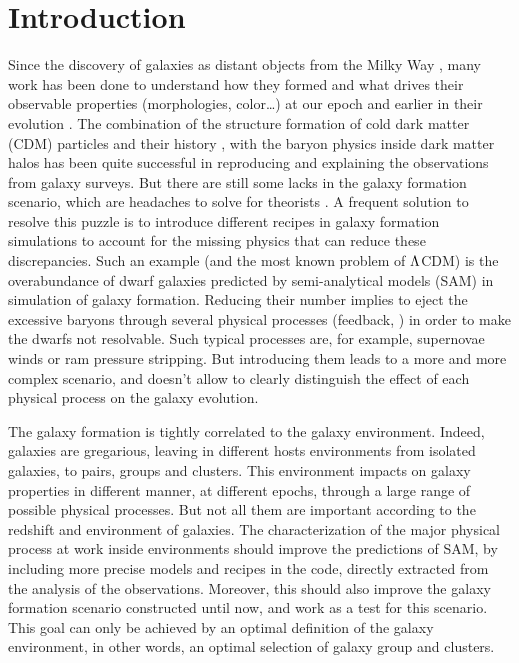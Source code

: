 \chapter{Introduction}
%
Since the discovery of galaxies as distant objects from the Milky Way
\citep{Hubble+29}, many work has been done to understand how they formed and
what drives their observable properties (morphologies, color\ldots) at our
epoch and earlier in their evolution \citep{Benson+10,Silk+12,Silk+13}. The
combination of the structure formation of cold dark matter (CDM) particles
and their history \citep{Zentner+07}, with the baryon physics inside dark
matter halos \citep{Kravtsov+12} has been quite successful in reproducing
and explaining the observations from galaxy surveys. But there are still
some lacks in the galaxy formation scenario, which are headaches to solve
for theorists \citep{Weinmann+12}. A frequent solution to resolve this
puzzle is to introduce different recipes in galaxy formation simulations to
account for the missing physics that can reduce these discrepancies.
%
Such an example (and the most known problem of $\rm \Lambda$CDM) is the
overabundance of dwarf galaxies predicted by semi-analytical models (SAM) in
simulation of galaxy formation. Reducing their number implies to eject the
excessive baryons through several physical processes (feedback,
\citet{Brooks+13}) in order to make the dwarfs not resolvable. Such typical
processes are, for example, supernovae winds \citep{Hirschmann+13} or ram
pressure stripping. But introducing them leads to a more and more
complex scenario, and doesn't allow to clearly distinguish the effect of
each physical process on the galaxy evolution.

The galaxy formation is tightly correlated to the galaxy environment.
Indeed, galaxies are gregarious, leaving in different hosts environments
from isolated galaxies, to pairs, groups and clusters. This environment
impacts on galaxy properties in different manner, at different epochs,
through a large range of possible physical processes. But not all them are
important according to the redshift and environment of galaxies. The
characterization of the major physical process at work inside environments
should improve the predictions of SAM, by including more precise models and
recipes in the code, directly extracted from the analysis of the
observations. Moreover, this should also improve the galaxy formation
scenario constructed until now, and work as a test for this scenario. This
goal can only be achieved by an optimal definition of the galaxy
environment, in other words, an optimal selection of galaxy group and
clusters.


